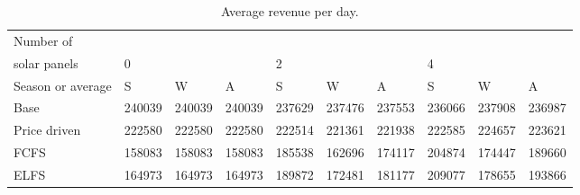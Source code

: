 \begin{table}[h]
\centering
\begin{tabular}{l|lll|lll|lll}Number of \\ solar panels&0& & &2& & &4& & \\ \hline
Season or average & S & W & A & S & W & A & S & W & A \\ \hline
Base&240039&240039&240039&237629&237476&237553&236066&237908&236987 \\
Price driven&222580&222580&222580&222514&221361&221938&222585&224657&223621 \\
FCFS&158083&158083&158083&185538&162696&174117&204874&174447&189660 \\
ELFS&164973&164973&164973&189872&172481&181177&209077&178655&193866 \\
\end{tabular}
\caption{Average revenue per day.}
\label{avg rev}
\end{table}
